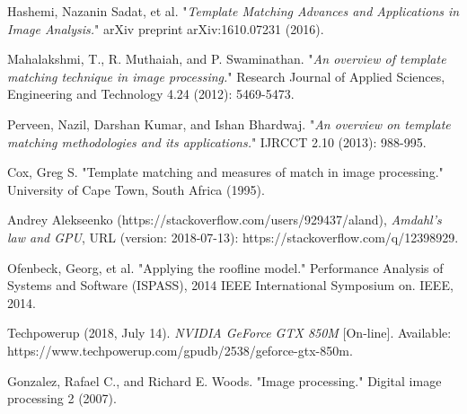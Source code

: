 \cleardoublepage
{}
{}
\begin{thebibliography}{99}

Hashemi, Nazanin Sadat, et al. "\textit{Template Matching Advances and Applications in Image Analysis.}" arXiv preprint arXiv:1610.07231 (2016).


Mahalakshmi, T., R. Muthaiah, and P. Swaminathan. "\textit{An overview of template matching technique in image processing.}" Research Journal of Applied Sciences, Engineering and Technology 4.24 (2012): 5469-5473.

Perveen, Nazil, Darshan Kumar, and Ishan Bhardwaj. "\textit{An overview on template matching methodologies and its applications.}" IJRCCT 2.10 (2013): 988-995.

Cox, Greg S. "Template matching and measures of match in image processing." University of Cape Town, South Africa (1995).

Andrey Alekseenko (https://stackoverflow.com/users/929437/aland), \textit{Amdahl's law and GPU}, URL (version: 2018-07-13): https://stackoverflow.com/q/12398929.

Ofenbeck, Georg, et al. "Applying the roofline model." Performance Analysis of Systems and Software (ISPASS), 2014 IEEE International Symposium on. IEEE, 2014.

Techpowerup (2018, July 14). \textit{NVIDIA GeForce GTX 850M} [On-line]. Available: https://www.techpowerup.com/gpudb/2538/geforce-gtx-850m.

Gonzalez, Rafael C., and Richard E. Woods. "Image processing." Digital image processing 2 (2007).
\end{thebibliography}
